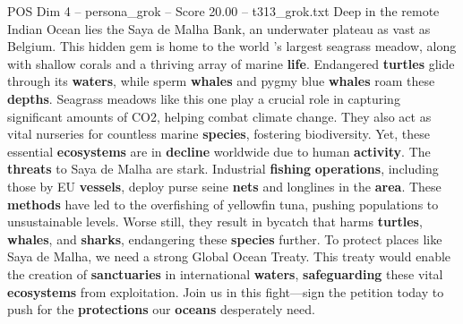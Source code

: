 \begin{textsample}{POS Dim 4 – persona\_grok – Score 20.00 – t313\_grok.txt}  \label{ex:f4_pos_032}
Deep in the remote Indian Ocean lies the Saya de Malha Bank, an underwater plateau as vast as Belgium.
This hidden gem is home to the world 's largest seagrass meadow, along with shallow corals and a thriving array of marine \textbf{life}.
Endangered \textbf{turtles} glide through its \textbf{waters}, while sperm \textbf{whales} and pygmy blue \textbf{whales} roam these \textbf{depths}.
Seagrass meadows like this one play a crucial role in capturing significant amounts of CO2, helping combat climate change.
They also act as vital nurseries for countless marine \textbf{species}, fostering biodiversity.
Yet, these essential \textbf{ecosystems} are in \textbf{decline} worldwide due to human \textbf{activity}.
The \textbf{threats} to Saya de Malha are stark.
Industrial \textbf{fishing} \textbf{operations}, including those by EU \textbf{vessels}, deploy purse seine \textbf{nets} and longlines in the \textbf{area}.
These \textbf{methods} have led to the overfishing of yellowfin tuna, pushing populations to unsustainable levels.
Worse still, they result in bycatch that harms \textbf{turtles}, \textbf{whales}, and \textbf{sharks}, endangering these \textbf{species} further.
To protect places like Saya de Malha, we need a strong Global Ocean Treaty.
This treaty would enable the creation of \textbf{sanctuaries} in international \textbf{waters}, \textbf{safeguarding} these vital \textbf{ecosystems} from exploitation.
Join us in this fight—sign the petition today to push for the \textbf{protections} our \textbf{oceans} desperately need.

\end{textsample}
